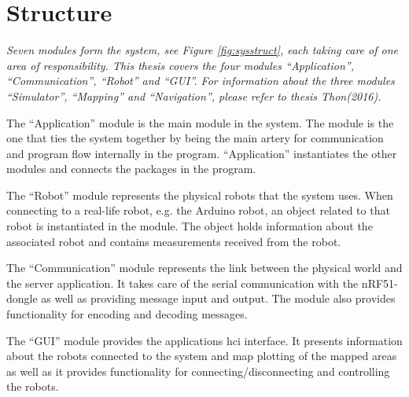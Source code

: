 \section{Structure}
\label{secr:structure}
\textit{Seven modules form the system, see Figure \ref{fig:sysstruct}, each taking care of one area of responsibility. This thesis covers the four modules ``Application'', ``Communication'', ``Robot'' and ``GUI''. For information about the three modules ``Simulator'', ``Mapping'' and ``Navigation'', please refer to thesis Thon(2016).}

The ``Application'' module is the main module in the system. The module is the one that ties the system together by being the main artery for communication and program flow internally in the program. ``Application'' instantiates the other modules and connects the packages in the program.

The ``Robot'' module represents the physical robots that the system uses. When connecting to a real-life robot, e.g. the Arduino robot, an object related to that robot is instantiated in the module. The object holds information about the associated robot and contains measurements received from the robot.

The ``Communication'' module represents the link between the physical world and the server application. It takes care of the serial communication with the nRF51-dongle as well as providing message input and output. The module also provides functionality for encoding and decoding messages.

The ``GUI'' module provides the applications \acrshort{hci} interface. It presents information about the robots connected to the system and map plotting of the mapped areas as well as it provides functionality for connecting/disconnecting and controlling the robots.

